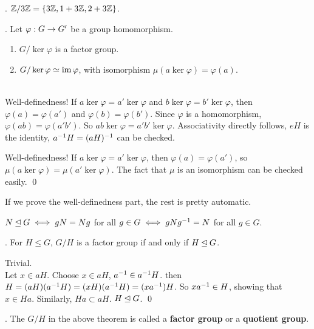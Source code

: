 \ex. \(\mathbb{Z} / 3\mathbb{Z} = \{3\mathbb{Z}, 1 + 3\mathbb{Z}, 2 + 3\mathbb{Z}\}\).

\thm. Let \(\varphi : G \rightarrow G'\) be a group homomorphism.
\begin{enumerate}
    \item \(G / \ker\varphi\) is a factor group.
    \item {} \(G / \ker\varphi \simeq \operatorname{im} \varphi\), with isomorphism \(\mu(a \ker\varphi) = \varphi(a)\).
\end{enumerate}

\pf \\
 Well-definedness! If \(a \ker\varphi = a' \ker\varphi\) and \(b \ker\varphi = b' \ker\varphi\), then \(\varphi(a) = \varphi(a')\) and \(\varphi(b) = \varphi(b')\). Since \(\varphi\) is a homomorphism, \(\varphi(ab) = \varphi(a'b')\). So \(ab \ker\varphi = a'b' \ker\varphi\). Associativity directly follows, \(eH\) is the identity, \(a^{-1} H = (aH)^{-1}\) can be checked.

 Well-definedness! If \(a \ker\varphi = a' \ker\varphi\), then \(\varphi(a) = \varphi(a')\), so \(\mu(a \ker\varphi) = \mu(a' \ker\varphi)\). The fact that \(\mu\) is an isomorphism can be checked easily. \qed

If we prove the well-definedness part, the rest is pretty automatic.

\recall \(N \unlhd G \iff gN = Ng\) for all \(g \in G \iff gNg^{-1} = N\) for all \(g \in G\).

\thm. For \(H \leq G\), \(G/H\) is a factor group if and only if \(H \unlhd G\).

\pf \note{\mimpd} Trivial. \\
\note{\mimp} Let \(x \in aH\). Choose \(x \in aH\), \(a^{-1} \in a^{-1} H\). then \(H = (aH)(a^{-1} H) = (xH)(a^{-1} H) = (xa^{-1}) H\). So \(xa^{-1} \in H\), showing that \(x \in Ha\). Similarly, \(Ha \subset aH\). \(H \unlhd G\). \qed

. The \(G / H\) in the above theorem is called a \textbf{factor group} or a \textbf{quotient group}.

\smallskip
